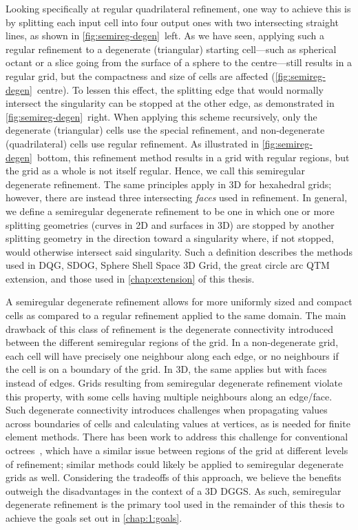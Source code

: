 Looking specifically at regular quadrilateral refinement, one way to achieve this is by splitting each input cell into four output ones with two intersecting straight lines, as shown in \cref{fig:semireg-degen}~left.
As we have seen, applying such a regular refinement to a degenerate (triangular) starting cell---such as spherical octant or a slice going from the surface of a sphere to the centre---still results in a regular grid, but the compactness and size of cells are affected (\cref{fig:semireg-degen}~centre).
To lessen this effect, the splitting edge that would normally intersect the singularity can be stopped at the other edge, as demonstrated in \cref{fig:semireg-degen}~right.
When applying this scheme recursively, only the degenerate (triangular) cells use the special refinement, and non-degenerate (quadrilateral) cells use regular refinement.
As illustrated in \cref{fig:semireg-degen}~bottom, this refinement method results in a grid with regular regions, but the grid as a whole is not itself regular.
Hence, we call this semiregular degenerate refinement.
The same principles apply in 3D for hexahedral grids; however, there are instead three intersecting \textit{faces} used in refinement.
In general, we define a semiregular degenerate refinement to be one in which one or more splitting geometries (curves in 2D and surfaces in 3D) are stopped by another splitting geometry in the direction toward a singularity where, if not stopped, would otherwise intersect said singularity.
Such a definition describes the methods used in DQG, SDOG, Sphere Shell Space 3D Grid, the great circle arc QTM extension, and those used in \cref{chap:extension} of this thesis.


A semiregular degenerate refinement allows for more uniformly sized and compact cells as compared to a regular refinement applied to the same domain.
The main drawback of this class of refinement is the degenerate connectivity introduced between the different semiregular regions of the grid.
In a non-degenerate grid, each cell will have precisely one neighbour along each edge, or no neighbours if the cell is on a boundary of the grid.
In 3D, the same applies but with faces instead of edges.
Grids resulting from semiregular degenerate refinement violate this property, with some cells having multiple neighbours along an edge/face.
Such degenerate connectivity introduces challenges when propagating values across boundaries of cells and calculating values at vertices, as is needed for finite element methods.
There has been work to address this challenge for conventional octrees~\cite{braun2008douar}, which have a similar issue between regions of the grid at different levels of refinement; similar methods could likely be applied to semiregular degenerate grids as well.
Considering the tradeoffs of this approach, we believe the benefits outweigh the disadvantages in the context of a 3D DGGS.
As such, semiregular degenerate refinement is the primary tool used in the remainder of this thesis to achieve the goals set out in \cref{chap:1:goals}.
